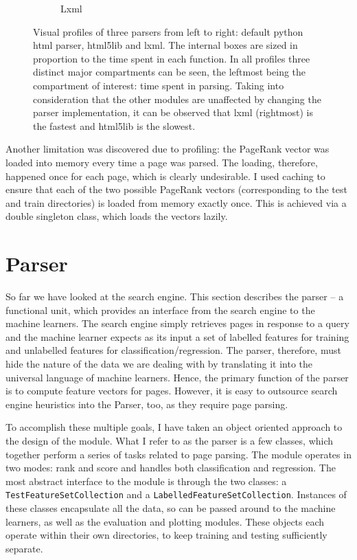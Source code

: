 \documentclass[12pt,notitlepage,twoside]{scrbook}
\begin{document}
\begin{figure}[h!]
\begin{subfigure}[b]{.3\textwidth}
  \caption{Lxml}
  \label{lxml}
\end{subfigure}
\caption{Visual profiles of three parsers from left to right: default python
html parser, html5lib and lxml. The internal boxes are sized in proportion to
the time spent in each function. In all profiles three distinct major
compartments can be seen, the leftmost being the compartment of interest: 
time spent in parsing. Taking into consideration that the other modules are unaffected by changing the parser
implementation, it can be observed that lxml (rightmost) is the fastest and
html5lib is the slowest.\label{parsers}}
\end{figure}

Another limitation was discovered due to profiling: the PageRank vector
was loaded into memory every time a page was parsed. The loading, therefore, happened once for each page, which
is clearly undesirable. I used caching to ensure that each of the two possible
PageRank vectors (corresponding to the test and train directories) is loaded
from memory exactly once. This is achieved via a double singleton class, which
loads the vectors lazily.


\section{Parser}
\label{sec:parser}
So far we have looked at the search engine. This section describes the parser -- a
functional unit, which provides an interface from the search engine to the machine
learners.  The search engine simply retrieves pages in response to a query and the machine
learner expects as its input a set of labelled features for training and unlabelled
features for classification/regression.  The parser, therefore, must hide the nature of
the data we are dealing with by translating it into the universal language of machine
learners. Hence, the primary function of the parser is to compute feature vectors for
pages.  However, it is easy to outsource search engine heuristics into the Parser, too, as
they require page parsing. 

To accomplish these multiple goals, I have
taken an object oriented approach to the design of the module. What I refer to
as the parser is a few classes, which together perform a series of tasks
related to page parsing.  The module operates in two modes: rank and score and
handles both classification and regression. The most abstract interface to the module is through the two
classes: a \texttt{TestFeatureSetCollection} and a
\texttt{LabelledFeatureSetCollection}. Instances of these classes encapsulate all the data,
so can be passed around to the machine learners, as well as the evaluation and
plotting modules. These objects each operate within their own directories, to
keep training and testing sufficiently separate.
\end{document}
